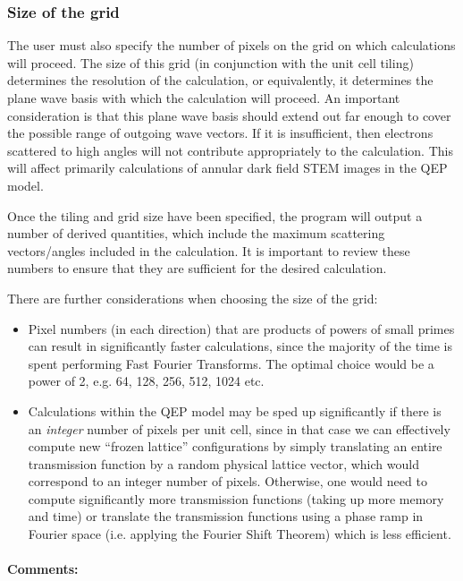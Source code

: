 \documentclass[12pt,a4paper]{article}
\begin{document}
\subsubsection{Size of the grid}

The user must also specify the number of pixels on the grid on which calculations will proceed.
The size of this grid (in conjunction with the unit cell tiling) determines the resolution of the calculation, or equivalently, it determines the plane wave basis with which the calculation will proceed.
An important consideration is that this plane wave basis should extend out far enough to cover the possible range of outgoing wave vectors.
If it is insufficient, then electrons scattered to high angles will not contribute appropriately to the calculation.
This will affect primarily calculations of annular dark field STEM images in the QEP model.

Once the tiling and grid size have been specified, the program will output a number of derived quantities, which include the maximum scattering vectors/angles included in the calculation.
It is important to review these numbers to ensure that they are sufficient for the desired calculation.

There are further considerations when choosing the size of the grid:
%
\begin{itemize}
    \item Pixel numbers (in each direction) that are products of powers of small primes can result in significantly faster calculations, since the majority of the time is spent performing Fast Fourier Transforms.
        The optimal choice would be a power of 2, e.g. 64, 128, 256, 512, 1024 etc.

    \item Calculations within the QEP model may be sped up significantly if there is an \emph{integer} number of pixels per unit cell, since in that case we can effectively compute new ``frozen lattice'' configurations by simply translating an entire transmission function by a random physical lattice vector, which would correspond to an integer number of pixels.
        Otherwise, one would need to compute significantly more transmission functions (taking up more memory and time) or translate the transmission functions using a phase ramp in Fourier space (i.e. applying the Fourier Shift Theorem) which is less efficient.
\end{itemize}

\paragraph{Comments:}
\end{document}
